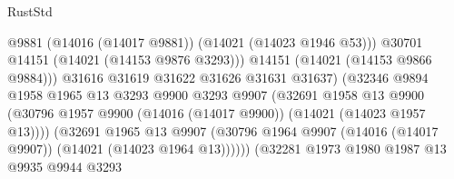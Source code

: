 \begin{lexlean}{RustStd}
\begin{coremodule}
                                                @9881
                                                (@14016 (@14017 @9881))
                                                (@14021 (@14023 @1946 @53)))
                                              @30701
                                              @14151
                                              (@14021 (@14153 @9876 @3293)))
                                            @14151
                                            (@14021 (@14153 @9866 @9884)))
                                          @31616
                                          @31619
                                          @31622
                                          @31626
                                          @31631
                                          @31637)
                                        (@32346
                                          @9894
                                          @1958
                                          @1965
                                          @13
                                          @3293
                                          @9900
                                          @3293
                                          @9907
                                          (@32691
                                            @1958
                                            @13
                                            @9900
                                            (@30796
                                              @1957
                                              @9900
                                              (@14016 (@14017 @9900))
                                              (@14021 (@14023 @1957 @13))))
                                          (@32691
                                            @1965
                                            @13
                                            @9907
                                            (@30796
                                              @1964
                                              @9907
                                              (@14016 (@14017 @9907))
                                              (@14021 (@14023 @1964 @13))))))
                                      (@32281
                                        @1973
                                        @1980
                                        @1987
                                        @13
                                        @9935
                                        @9944
                                        @3293

\end{coremodule}
\end{lexlean}
